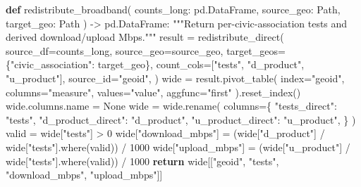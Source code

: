 \documentclass[
  letterpaper,
  DIV=11,
  numbers=noendperiod]{scrreprt}
\newenvironment{Shaded}{\begin{snugshade}}{\end{snugshade}}
\newcommand{\CommentTok}[1]{\textcolor[rgb]{0.37,0.37,0.37}{#1}}
\newcommand{\ControlFlowTok}[1]{\textcolor[rgb]{0.00,0.23,0.31}{\textbf{#1}}}
\newcommand{\DecValTok}[1]{\textcolor[rgb]{0.68,0.00,0.00}{#1}}
\newcommand{\KeywordTok}[1]{\textcolor[rgb]{0.00,0.23,0.31}{\textbf{#1}}}
\newcommand{\NormalTok}[1]{\textcolor[rgb]{0.00,0.23,0.31}{#1}}
\newcommand{\OperatorTok}[1]{\textcolor[rgb]{0.37,0.37,0.37}{#1}}
\newcommand{\StringTok}[1]{\textcolor[rgb]{0.13,0.47,0.30}{#1}}
\newcommand{\VariableTok}[1]{\textcolor[rgb]{0.07,0.07,0.07}{#1}}
\begin{document}
\begin{Shaded}
\begin{Highlighting}[]
\KeywordTok{def}\NormalTok{ redistribute\_broadband(}
\NormalTok{    counts\_long: pd.DataFrame, source\_geo: Path, target\_geo: Path}
\NormalTok{) }\OperatorTok{{-}\textgreater{}}\NormalTok{ pd.DataFrame:}
    \CommentTok{"""Return per{-}civic{-}association tests and derived download/upload Mbps."""}
\NormalTok{    result }\OperatorTok{=}\NormalTok{ redistribute\_direct(}
\NormalTok{        source\_df}\OperatorTok{=}\NormalTok{counts\_long,}
\NormalTok{        source\_geo}\OperatorTok{=}\NormalTok{source\_geo,}
\NormalTok{        target\_geos}\OperatorTok{=}\NormalTok{\{}\StringTok{"civic\_association"}\NormalTok{: target\_geo\},}
\NormalTok{        count\_cols}\OperatorTok{=}\NormalTok{[}\StringTok{"tests"}\NormalTok{, }\StringTok{"d\_product"}\NormalTok{, }\StringTok{"u\_product"}\NormalTok{],}
\NormalTok{        source\_id}\OperatorTok{=}\StringTok{"geoid"}\NormalTok{,}
\NormalTok{    )}
\NormalTok{    wide }\OperatorTok{=}\NormalTok{ result.pivot\_table(}
\NormalTok{        index}\OperatorTok{=}\StringTok{"geoid"}\NormalTok{, columns}\OperatorTok{=}\StringTok{"measure"}\NormalTok{, values}\OperatorTok{=}\StringTok{"value"}\NormalTok{, aggfunc}\OperatorTok{=}\StringTok{"first"}
\NormalTok{    ).reset\_index()}
\NormalTok{    wide.columns.name }\OperatorTok{=} \VariableTok{None}
\NormalTok{    wide }\OperatorTok{=}\NormalTok{ wide.rename(}
\NormalTok{        columns}\OperatorTok{=}\NormalTok{\{}
            \StringTok{"tests\_direct"}\NormalTok{: }\StringTok{"tests"}\NormalTok{,}
            \StringTok{"d\_product\_direct"}\NormalTok{: }\StringTok{"d\_product"}\NormalTok{,}
            \StringTok{"u\_product\_direct"}\NormalTok{: }\StringTok{"u\_product"}\NormalTok{,}
\NormalTok{        \}}
\NormalTok{    )}
\NormalTok{    valid }\OperatorTok{=}\NormalTok{ wide[}\StringTok{"tests"}\NormalTok{] }\OperatorTok{\textgreater{}} \DecValTok{0}
\NormalTok{    wide[}\StringTok{"download\_mbps"}\NormalTok{] }\OperatorTok{=}\NormalTok{ (wide[}\StringTok{"d\_product"}\NormalTok{] }\OperatorTok{/}\NormalTok{ wide[}\StringTok{"tests"}\NormalTok{].where(valid)) }\OperatorTok{/} \DecValTok{1000}
\NormalTok{    wide[}\StringTok{"upload\_mbps"}\NormalTok{] }\OperatorTok{=}\NormalTok{ (wide[}\StringTok{"u\_product"}\NormalTok{] }\OperatorTok{/}\NormalTok{ wide[}\StringTok{"tests"}\NormalTok{].where(valid)) }\OperatorTok{/} \DecValTok{1000}
    \ControlFlowTok{return}\NormalTok{ wide[[}\StringTok{"geoid"}\NormalTok{, }\StringTok{"tests"}\NormalTok{, }\StringTok{"download\_mbps"}\NormalTok{, }\StringTok{"upload\_mbps"}\NormalTok{]]}



\end{Highlighting}
\end{Shaded}
\end{document}
